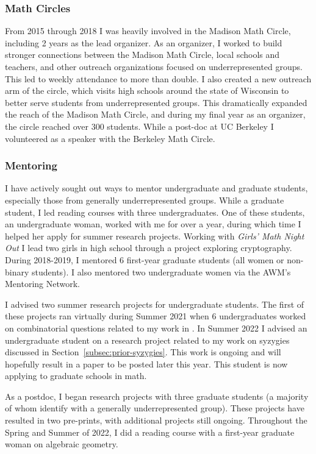 \documentclass[11pt,reqno]{amsart}
\theoremstyle{remark}
\begin{document}
\subsubsection{Math Circles}
	From 2015 through 2018 I was heavily involved in the Madison Math Circle, including  2 years as the lead organizer. As an organizer, I worked to build stronger connections between the Madison Math Circle, local schools and teachers, and other outreach organizations focused on underrepresented groups. This led to weekly attendance to more than double. I also created a new outreach arm of the circle, which visits high schools around the state of Wisconsin to better serve students from underrepresented groups. This dramatically expanded the reach of the Madison Math Circle, and during my final year as an organizer, the circle reached over 300 students. While a post-doc at UC Berkeley I volunteered as a speaker with the Berkeley Math Circle. 

\subsubsection{Mentoring}
I have actively sought out ways to mentor undergraduate and graduate students, especially those from generally underrepresented groups. While a graduate student, I led reading courses with three undergraduates. One of these students, an undergraduate woman, worked with me for over a year, during which time I helped her apply for summer research projects. Working with \textit{Girls' Math Night Out} I lead two girls in high school through a project exploring cryptography. During 2018-2019, I mentored 6 first-year graduate students (all women or non-binary students). I also mentored two undergraduate women via the AWM's Mentoring Network. 

I advised two summer research projects for undergraduate students. The first of these projects ran virtually during Summer 2021 when 6 undergraduates worked on combinatorial questions related to my work in \cite{BBCMMW22}. In Summer 2022 I advised an undergraduate student on a research project related to my work on syzygies discussed in Section~\ref{subsec:prior-syzygies}. This work is ongoing and will hopefully result in a paper to be posted later this year. This student is now applying to graduate schools in math. 

As a postdoc, I began research projects with three graduate students (a majority of whom identify with a generally underrepresented group). These projects have resulted in two pre-prints, with additional projects still ongoing. Throughout the Spring and Summer of 2022, I did a reading course with a first-year graduate woman on algebraic geometry.
\end{document}

